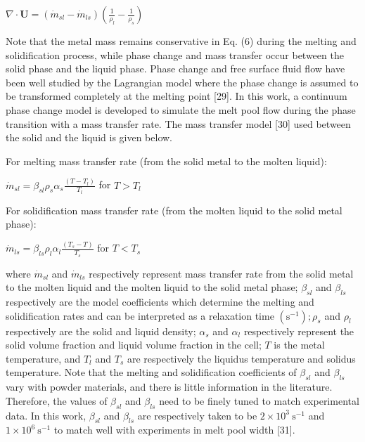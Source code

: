 \documentclass[10pt]{article}
\begin{document}
$\nabla \cdot \mathbf{U}=\left(\dot{m}_{s l}-\dot{m}_{l s}\right)\left(\frac{1}{\rho_{l}}-\frac{1}{\rho_{s}}\right)$

Note that the metal mass remains conservative in Eq. (6) during the melting and solidification process, while phase change and mass transfer occur between the solid phase and the liquid phase. Phase change and free surface fluid flow have been well studied by the Lagrangian model where the phase change is assumed to be transformed completely at the melting point [29]. In this work, a continuum phase change model is developed to simulate the melt pool flow during the phase transition with a mass transfer rate. The mass transfer model [30] used between the solid and the liquid is given below.

For melting mass transfer rate (from the solid metal to the molten liquid):

$\dot{m}_{s l}=\beta_{s l} \rho_{s} \alpha_{s} \frac{\left(T-T_{l}\right)}{T_{l}}$ for $T>T_{l}$

For solidification mass transfer rate (from the molten liquid to the solid metal phase):

$\dot{m}_{l s}=\beta_{l s} \rho_{l} \alpha_{l} \frac{\left(T_{s}-T\right)}{T_{s}}$ for $T<T_{s}$

where $\dot{m}_{s l}$ and $\dot{m}_{l s}$ respectively represent mass transfer rate from the solid metal to the molten liquid and the molten liquid to the solid metal phase; $\beta_{s l}$ and $\beta_{l s}$ respectively are the model coefficients which determine the melting and solidification rates and can be interpreted as a relaxation time $\left(\mathrm{s}^{-1}\right) ; \rho_{s}$ and $\rho_{l}$ respectively are the solid and liquid density; $\alpha_{s}$ and $\alpha_{l}$ respectively represent the solid volume fraction and liquid volume fraction in the cell; $T$ is the metal temperature, and $T_{l}$ and $T_{s}$ are respectively the liquidus temperature and solidus temperature. Note that the melting and solidification coefficients of $\beta_{s l}$ and $\beta_{l s}$ vary with powder materials, and there is little information in the literature. Therefore, the values of $\beta_{s l}$ and $\beta_{l s}$ need to be finely tuned to match experimental data. In this work, $\beta_{s l}$ and $\beta_{l s}$ are respectively taken to be $2 \times 10^{3} \mathrm{~s}^{-1}$ and $1 \times 10^{6} \mathrm{~s}^{-1}$ to match well with experiments in melt pool width [31].
\end{document}
